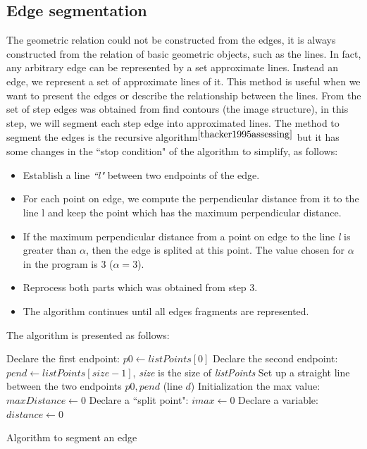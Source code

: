 \subsection{Edge segmentation}
The geometric relation could not be constructed from the edges, it is always constructed from the relation of basic geometric objects, such as the lines.  In fact, any arbitrary edge can be represented by a set approximate lines. Instead an edge, we represent a set of approximate lines of it. This method is useful when we want to present the edges or describe the relationship between the lines. From the set of step edges was obtained from find contours (the image structure), in this step, we will segment each step edge into approximated lines. The method to segment the edges is the recursive algorithm$^{\cite{thacker1995assessing}}$ but it has some changes in the ``stop condition" of the algorithm to simplify, as follows:
\begin{itemize}
\item Establish a line \textit{``l"} between two endpoints of the edge.
\item For each point on edge, we compute the perpendicular distance from it to the line l and keep the point which has the maximum perpendicular distance.
\item If the maximum perpendicular distance from a point on edge to the line \textit{l} is greater than $\alpha$, then the edge is splited at this point. The value chosen for $\alpha$ in the program is 3 ($\alpha = 3$).
\item Reprocess both parts which was obtained from step 3.
\item The algorithm continues until all edges fragments are represented.
\end{itemize}
The algorithm is presented as follows:\\
\IncMargin{1em}
\begin{algorithm}[H]
\Indm 
{}
\Indp
Declare the first endpoint: $p0 \leftarrow listPoints[0]$\;
Declare the second endpoint: $pend \leftarrow listPoints[size - 1]$, \textit{size} is the size of \textit{listPoints}\;
Set up a straight line between the two endpoints $p0, pend$ (line $d$)\;
Initialization the max value: $maxDistance  \leftarrow 0 $\;
Declare a ``split point": $imax \leftarrow 0$ \; 
Declare a variable: $distance \leftarrow 0$\;

\caption{Algorithm to segment an edge}
\end{algorithm}\DecMargin{1em}
